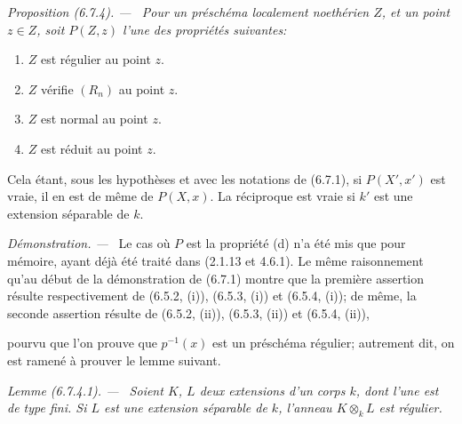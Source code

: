 \documentclass[10pt,oneside]{book}
\newcommand{\oldpage}[2][]{%
  \setcounter{footnote}{0}%
  \marginpar{\scriptsize\textbf{#1}~|~#2}\ignorespaces}
\newenvironment{proposition}[1][]{%
  \par\medskip\noindent\itshape Proposition (#1). ---\ }{\par}
\newenvironment{lemma}[1][]{%
  \par\medskip\noindent\itshape Lemme (#1). ---\ }{\par}
\newenvironment{proof}{%
  \par\medskip\noindent\textit{Démonstration. ---\ }}{\par}
\begin{document}
\begin{proposition}[6.7.4]
\label{IV.2.s6.7.4-fr}
Pour un préschéma localement noethérien $Z$, et un point $z\in Z$,
soit $P(Z,z)$ l'une des propriétés suivantes:
\begin{enumerate}
\item[(a)] $Z$ est régulier au point $z$.
\item[(b)] $Z$ vérifie $(R_n)$ au point $z$.
\item[(c)] $Z$ est normal au point $z$.
\item[(d)] $Z$ est réduit au point $z$.
\end{enumerate}
Cela étant, sous les hypothèses et avec les notations de (6.7.1), si
$P(X',x')$ est vraie, il en est de même de $P(X,x)$. La réciproque est
vraie si $k'$ est une extension séparable de $k$.
\end{proposition}

\begin{proof}
Le cas où $P$ est la propriété (d) n'a été mis que pour mémoire, ayant
déjà été traité dans (2.1.13 et 4.6.1). Le même raisonnement qu'au début
de la démonstration de (6.7.1) montre que la première assertion résulte
respectivement de (6.5.2, (i)), (6.5.3, (i)) et (6.5.4, (i)); de même,
la seconde assertion résulte de (6.5.2, (ii)), (6.5.3, (ii)) et
(6.5.4, (ii)),

\oldpage[IV-2]{147}

pourvu que l'on prouve que $p^{-1}(x)$ est un préschéma régulier; autrement
dit, on est ramené à prouver le lemme suivant.
\end{proof}

\begin{lemma}[6.7.4.1]
\label{IV.2.s6.7.4.1-fr}
Soient $K$, $L$ deux extensions d'un corps $k$, dont l'une est de type
fini. Si $L$ est une extension séparable de $k$, l'anneau $K\otimes_kL$
est régulier.
\end{lemma}
\end{document}
